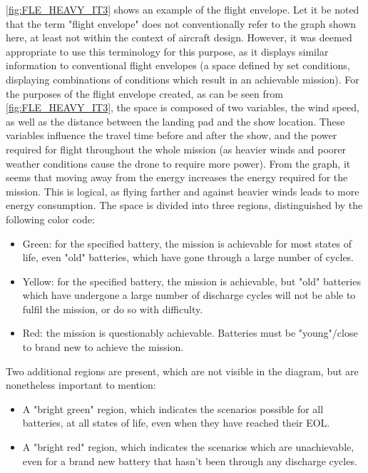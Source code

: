 \autoref{fig:FLE_HEAVY_IT3} shows an example of the flight envelope. Let it be noted that the term "flight envelope" does not conventionally refer to the graph shown here, at least not within the context of aircraft design. However, it was deemed appropriate to use this terminology for this purpose, as it displays similar information to conventional flight envelopes (a space defined by set conditions, displaying combinations of conditions which result in an achievable mission). For the purposes of the flight envelope created, as can be seen from \autoref{fig:FLE_HEAVY_IT3}, the space is composed of two variables, the wind speed, as well as the distance between the landing pad and the show location. These variables influence the travel time before and after the show, and the power required for flight throughout the whole mission (as heavier winds and poorer weather conditions cause the drone to require more power). From the graph, it seems that moving away from the energy increases the energy required for the mission. This is logical, as flying farther and against heavier winds leads to more energy consumption. The space is divided into three regions, distinguished by the following color code:
\begin{itemize}[noitemsep]
    \item Green: for the specified battery, the mission is achievable for most states of life, even "old" batteries, which have gone through a large number of cycles.
    \item Yellow: for the specified battery, the mission is achievable, but "old" batteries which have undergone a large number of discharge cycles will not be able to fulfil the mission, or do so with difficulty.
    \item Red: the mission is questionably achievable. Batteries must be "young"/close to brand new to achieve the mission.
\end{itemize}
Two additional regions are present, which are not visible in the diagram, but are nonetheless important to mention:
\begin{itemize}[noitemsep]
    \item A "bright green" region, which indicates the scenarios possible for all batteries, at all states of life, even when they have reached their EOL.
    \item A "bright red" region, which indicates the scenarios which are unachievable, even for a brand new battery that hasn't been through any discharge cycles.
\end{itemize}

